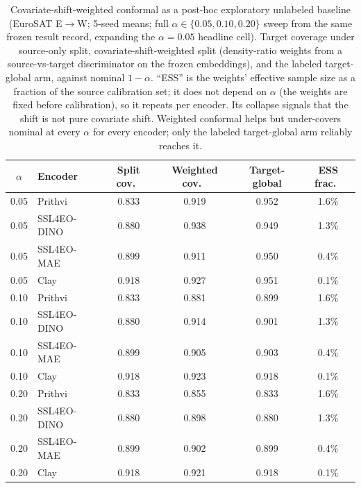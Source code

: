 \documentclass[preprint,11pt,authoryear]{elsarticle}
\begin{document}
\begin{table}[htbp]\centering\small
\caption{Covariate-shift-weighted conformal as a post-hoc exploratory
unlabeled baseline (EuroSAT E$\to$W; 5-seed means; full $\alpha\in\{0.05,0.10,0.20\}$ sweep from the same
frozen result record, expanding the $\alpha{=}0.05$ headline cell). Target coverage under source-only
split, covariate-shift-weighted split (density-ratio weights from a source-vs-target discriminator on the
frozen embeddings), and the labeled target-global arm, against nominal $1{-}\alpha$. ``ESS'' is the
weights' effective sample size as a fraction of the source calibration set; it does not depend on $\alpha$
(the weights are fixed before calibration), so it repeats per encoder. Its collapse signals that the shift
is not pure covariate shift. Weighted conformal helps but under-covers nominal at every $\alpha$ for every
encoder; only the labeled target-global arm reliably reaches it.}\label{tab:weighted}
\begin{tabular}{clcccc}
\toprule
$\alpha$ & Encoder & Split cov.\ & Weighted cov.\ & Target-global & ESS frac.\ \\
\midrule
0.05 & Prithvi     & 0.833 & 0.919 & 0.952 & 1.6\% \\
0.05 & SSL4EO-DINO & 0.880 & 0.938 & 0.949 & 1.3\% \\
0.05 & SSL4EO-MAE  & 0.899 & 0.911 & 0.950 & 0.4\% \\
0.05 & Clay        & 0.918 & 0.927 & 0.951 & 0.1\% \\
\midrule
0.10 & Prithvi     & 0.833 & 0.881 & 0.899 & 1.6\% \\
0.10 & SSL4EO-DINO & 0.880 & 0.914 & 0.901 & 1.3\% \\
0.10 & SSL4EO-MAE  & 0.899 & 0.905 & 0.903 & 0.4\% \\
0.10 & Clay        & 0.918 & 0.923 & 0.918 & 0.1\% \\
\midrule
0.20 & Prithvi     & 0.833 & 0.855 & 0.833 & 1.6\% \\
0.20 & SSL4EO-DINO & 0.880 & 0.898 & 0.880 & 1.3\% \\
0.20 & SSL4EO-MAE  & 0.899 & 0.902 & 0.899 & 0.4\% \\
0.20 & Clay        & 0.918 & 0.921 & 0.918 & 0.1\% \\
\bottomrule
\end{tabular}
\end{table}
\end{document}
